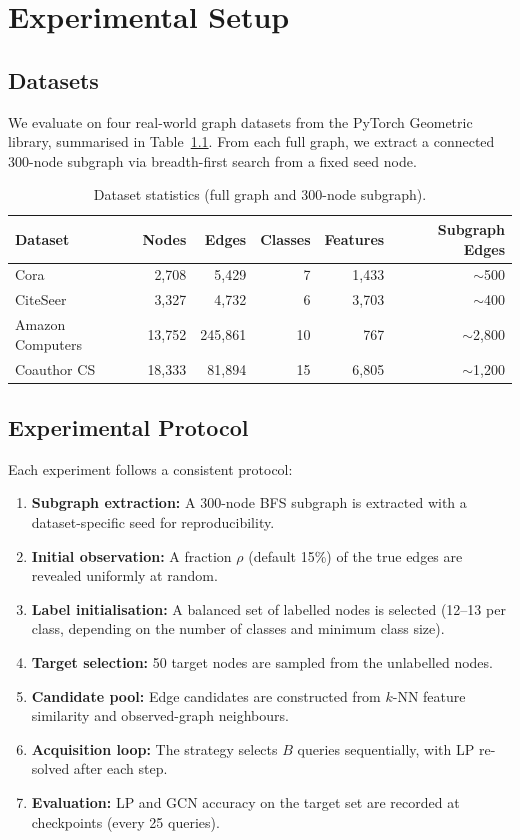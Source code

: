 \documentclass[12pt,a4paper,oneside]{report}
\begin{document}
\chapter{Experimental Setup}
\label{ch:setup}

\section{Datasets}

We evaluate on four real-world graph datasets from the PyTorch Geometric library, summarised in Table~\ref{tab:datasets}. From each full graph, we extract a connected 300-node subgraph via breadth-first search from a fixed seed node.

\begin{table}[htbp]
\centering
\caption{Dataset statistics (full graph and 300-node subgraph).}
\label{tab:datasets}
\small
\begin{tabular}{lrrrrr}
\toprule
Dataset & Nodes & Edges & Classes & Features & Subgraph Edges \\
\midrule
Cora & 2,708 & 5,429 & 7 & 1,433 & $\sim$500 \\
CiteSeer & 3,327 & 4,732 & 6 & 3,703 & $\sim$400 \\
Amazon Computers & 13,752 & 245,861 & 10 & 767 & $\sim$2,800 \\
Coauthor CS & 18,333 & 81,894 & 15 & 6,805 & $\sim$1,200 \\
\bottomrule
\end{tabular}
\end{table}

\section{Experimental Protocol}

Each experiment follows a consistent protocol:
\begin{enumerate}[leftmargin=2em]
    \item \textbf{Subgraph extraction:} A 300-node BFS subgraph is extracted with a dataset-specific seed for reproducibility.
    \item \textbf{Initial observation:} A fraction $\rho$ (default 15\%) of the true edges are revealed uniformly at random.
    \item \textbf{Label initialisation:} A balanced set of labelled nodes is selected (12--13 per class, depending on the number of classes and minimum class size).
    \item \textbf{Target selection:} 50 target nodes are sampled from the unlabelled nodes.
    \item \textbf{Candidate pool:} Edge candidates are constructed from $k$-NN feature similarity and observed-graph neighbours.
    \item \textbf{Acquisition loop:} The strategy selects $B$ queries sequentially, with LP re-solved after each step.
    \item \textbf{Evaluation:} LP and GCN accuracy on the target set are recorded at checkpoints (every 25 queries).
\end{enumerate}
\end{document}
